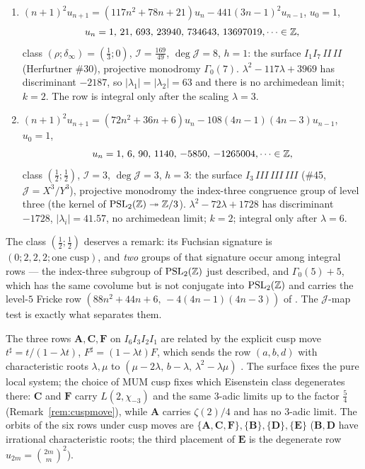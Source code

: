 \begin{proposition}\label{prop:newrows}
\begin{enumerate}[label=\textup{(\alph*)},leftmargin=2.4em]
\item $(n+1)^2u_{n+1}=(117n^2+78n+21)u_n-441(3n-1)^2u_{n-1}$, $u_0=1$,
\[u_n=1,\,21,\,693,\,23940,\,734643,\,13697019,\dots\in\mathbb{Z} ,\]
class $(\rho;\delta_\infty)=(\tfrac13;0)$, $\mathcal I=\tfrac{169}{49}$,
$\deg\mathcal J=8$, $h=1$: the surface $I_1I_7\,II\,II$
\textup{(}Herfurtner \#30\textup{)}, projective monodromy $\Gamma_0(7)$.
$\lambda^2-117\lambda+3969$ has discriminant $-2187$, so
$|\lambda_1|=|\lambda_2|=63$ and there is no archimedean limit; $k=2$.
The row is integral only after the scaling $\lambda=3$.
\item $(n+1)^2u_{n+1}=(72n^2+36n+6)u_n-108(4n-1)(4n-3)u_{n-1}$, $u_0=1$,
\[u_n=1,\,6,\,90,\,1140,\,-5850,\,-1265004,\dots\in\mathbb{Z} ,\]
class $(\tfrac12;\tfrac12)$, $\mathcal I=3$, $\deg\mathcal J=3$, $h=3$: the
surface $I_3\,III\,III\,III$ \textup{(}\#45, $\mathcal J=X^3/Y^3$\textup{)},
projective monodromy the index-three congruence group of level three
\textup{(}the kernel of $\operatorname{PSL}_2(\mathbb{Z})\twoheadrightarrow\mathbb{Z}/3$\textup{)}.
$\lambda^2-72\lambda+1728$ has discriminant $-1728$, $|\lambda_i|=41.57$, no
archimedean limit; $k=2$; integral only after $\lambda=6$.
\end{enumerate}
\end{proposition}

The class $(\tfrac12;\tfrac12)$ deserves a remark: its Fuchsian signature is
$(0;2,2,2;\text{one cusp})$, and \emph{two} groups of that signature occur among
integral rows --- the index-three subgroup of $\operatorname{PSL}_2(\mathbb{Z})$ just described, and
$\Gamma_0(5)+5$, which has the same covolume but is not conjugate into
$\operatorname{PSL}_2(\mathbb{Z})$ and carries the level-$5$ Fricke row
$(88n^2+44n+6,\,-4(4n-1)(4n-3))$ of \cite[\S5]{ProjNoncong}. The
$\mathcal J$-map test is exactly what separates them.

\begin{remark}
The three rows $\mathbf A,\mathbf C,\mathbf F$ on $I_6I_3I_2I_1$ are related by the explicit cusp move $t^\sharp=t/(1-\lambda t)$, $F^\sharp=(1-\lambda t)F$, which sends the row $(a,b,d)$ with characteristic roots $\lambda,\mu$ to $(\mu-2\lambda,\,b-\lambda,\,\lambda^2-\lambda\mu)$ \Proved{}. The surface fixes the pure local system; the choice of MUM cusp fixes which Eisenstein class degenerates there: $\mathbf C$ and $\mathbf F$ carry $L(2,\chi_{-3})$ and the same $3$-adic limits up to the factor $\tfrac54$ (Remark~\ref{rem:cuspmove}), while $\mathbf A$ carries $\zeta(2)/4$ and has no $3$-adic limit. The orbits of the six rows under cusp moves are $\{\mathbf A,\mathbf C,\mathbf F\},\{\mathbf B\},\{\mathbf D\},\{\mathbf E\}$ ($\mathbf B,\mathbf D$ have irrational characteristic roots; the third placement of $\mathbf E$ is the degenerate row $u_{2m}=\binom{2m}m^2$).
\end{remark}

